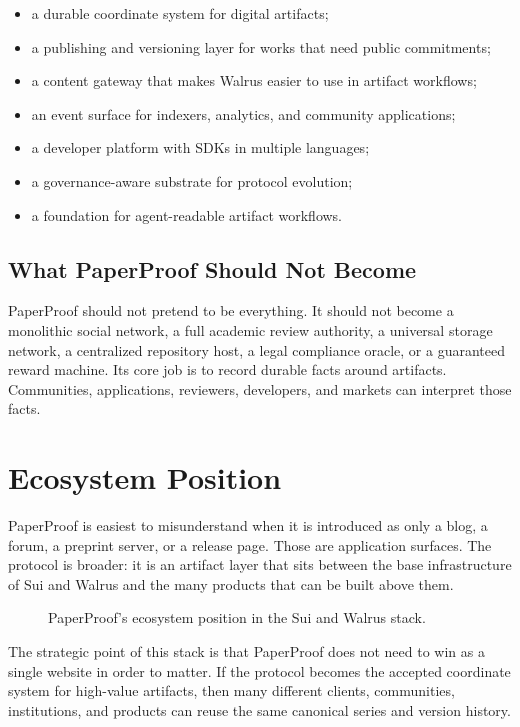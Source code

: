 \documentclass[11pt]{article}
\begin{document}
\begin{itemize}[leftmargin=*]
  \item a durable coordinate system for digital artifacts;
  \item a publishing and versioning layer for works that need public commitments;
  \item a content gateway that makes Walrus easier to use in artifact workflows;
  \item an event surface for indexers, analytics, and community applications;
  \item a developer platform with SDKs in multiple languages;
  \item a governance-aware substrate for protocol evolution;
  \item a foundation for agent-readable artifact workflows.
\end{itemize}

\subsection{What PaperProof Should Not Become}

PaperProof should not pretend to be everything. It should not become a monolithic
social network, a full academic review authority, a universal storage network, a
centralized repository host, a legal compliance oracle, or a guaranteed reward
machine. Its core job is to record durable facts around artifacts. Communities,
applications, reviewers, developers, and markets can interpret those facts.

\section{Ecosystem Position}

PaperProof is easiest to misunderstand when it is introduced as only a blog, a
forum, a preprint server, or a release page. Those are application surfaces.
The protocol is broader: it is an artifact layer that sits between the base
infrastructure of Sui and Walrus and the many products that can be built above
them.

\begin{figure}[htbp]
\centering

\caption{PaperProof's ecosystem position in the Sui and Walrus stack.}
\label{fig:ecosystem-stack}
\end{figure}

The strategic point of this stack is that PaperProof does not need to win as a
single website in order to matter. If the protocol becomes the accepted
coordinate system for high-value artifacts, then many different clients,
communities, institutions, and products can reuse the same canonical series and
version history.
\end{document}
